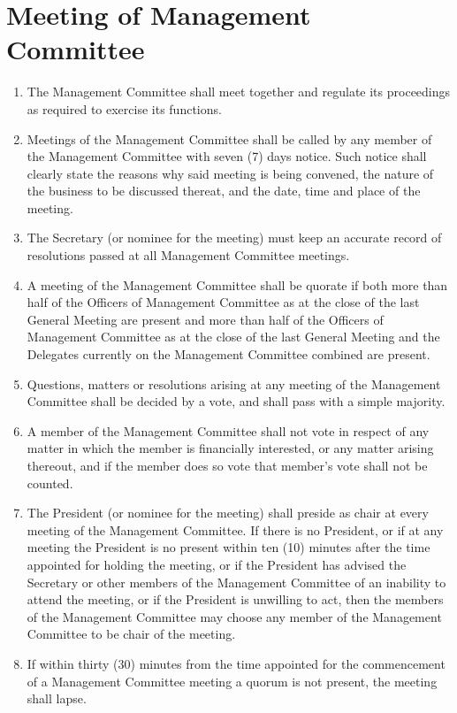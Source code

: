\documentclass[a4paper]{article}
\newcommand*{\sectionr}[1]{{\raggedright \section{#1}}}
\begin{document}
\sectionr{Meeting of Management Committee}
\begin{enumerate}
\item The Management Committee shall meet together and regulate its proceedings as required to exercise its functions.
\item Meetings of the Management Committee shall be called by any member of the Management Committee with seven (7) days notice. Such notice shall clearly state the reasons why said meeting is being convened, the nature of the business to be discussed thereat, and the date, time and place of the meeting.
\item The Secretary (or nominee for the meeting) must keep an accurate record of resolutions passed at all Management Committee meetings.
\item A meeting of the Management Committee shall be quorate if both more than half of the Officers of Management Committee as at the close of the last General Meeting are present and more than half of the Officers of Management Committee as at the close of the last General Meeting and the Delegates  currently on the Management Committee combined are present.
\item Questions, matters or resolutions arising at any meeting of the Management Committee shall be decided by a vote, and shall pass with a simple majority.
\item A member of the Management Committee shall not vote in respect of any matter in which the member is financially interested, or any matter arising thereout, and if the member does so vote that member's vote shall not be counted.
\item The President (or nominee for the meeting) shall preside as chair at every meeting of the Management Committee. If there is no President, or if at any meeting the President is no present within ten (10) minutes after the time appointed for holding the meeting, or if the President has advised the Secretary or other members of the Management Committee of an inability to attend the meeting, or if the President is unwilling to act, then the members of the Management Committee may choose any member of the Management Committee to be chair of the meeting.
\item If within thirty (30) minutes from the time appointed for the commencement of a Management Committee meeting a quorum is not present, the meeting shall lapse.
\end{enumerate}
\end{document}
